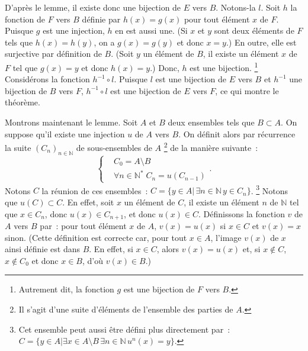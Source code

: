     D'après le lemme, il existe donc une bijection de $E$ vers $B$. 
    Notons-la $l$.
    Soit $h$ la fonction de $F$ vers $B$ définie par $h(x) = g(x)$ pour tout élément $x$ de $F$. 
    Puisque $g$ est une injection, $h$ en est aussi une. 
    (Si $x$ et $y$ sont deux éléments de $F$ tels que $h(x)=h(y)$, on a $g(x) = g(y)$ et donc $x=y$.)
    En outre, elle est surjective par définition de $B$. 
    (Soit $y$ un élément de $B$, il existe un élément $x$ de $F$ tel que $g(x)=y$ et donc $h(x)=y$.)
    Donc, $h$ est une bijection.
    \footnote{Autrement dit, la fonction $g$ est une bijection de $F$ vers $B$.}
    Considérons la fonction $h^{-1} \circ l$. 
    Puisque $l$ est une bijection de $E$ vers $B$ et $h^{-1}$ une bijection de $B$ vers $F$, $h^{-1} \circ l$ est une bijection de $E$ vers $F$, ce qui montre le théorème.

    Montrons maintenant le lemme. 
    Soit $A$ et $B$ deux ensembles tels que $B \subset A$. 
    On suppose qu'il existe une injection $u$ de $A$ vers $B$. 
    On définit alors par récurrence la suite $\left( C_n \right)_{n \in \mathbb{N}}$ de sous-ensembles de $A$%
    \footnote{Il s'agit d'une suite d'éléments de l'ensemble des parties de $A$.}
    de la manière suivante : 
    \begin{equation*}
        \left\lbrace \begin{aligned}
            & C_0 = A \setminus B \\
            & \forall n \in \mathbb{N}^* \; C_n = u \left( C_{n-1} \right)
        \end{aligned} \right. .
    \end{equation*}
    Notons $C$ la réunion de ces ensembles : $C = \lbrace y \in A \vert \, \exists n \in \mathbb{N} \, y \in C_n \rbrace$.%
    \footnote{Cet ensemble peut aussi être défini plus directement par : $C = \lbrace y \in A \vert \exists x \in A \setminus B \, \exists n \in \mathbb{N} \, u^n(x) = y \rbrace$.} 
    Notons que $u(C) \subset C$. En effet, soit $x$ un élément de $C$, il existe un élément $n$ de $\mathbb{N}$ tel que $x \in C_n$, donc $u(x) \in C_{n+1}$, et donc $u(x) \in C$.
    Définissons la fonction $v$ de $A$ vers $B$ par : pour tout élément $x$ de $A$, $v(x) = u(x)$ si $x \in C$ et $v(x) = x$ sinon. 
    (Cette définition est correcte car, pour tout $x \in A$, l'image $v(x)$ de $x$ ainsi définie est dans $B$. En effet, si $x \in C$, alors $v(x) = u(x)$ et, si $x \notin C$, $x \notin C_0$ et donc $x \in B$, d'où $v(x) \in B$.)

